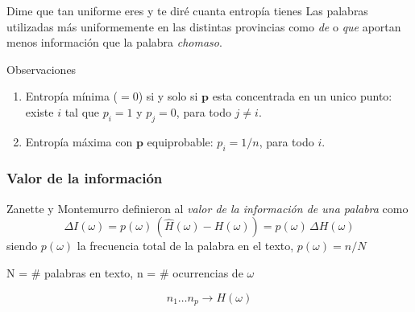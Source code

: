 \begin{frame}[t]
{\begin{columns}
    \end{columns}

}

{
    \begin{exampleblock}{Dime que tan uniforme eres y te diré cuanta entropía tienes} Las palabras utilizadas más uniformemente en las distintas provincias como \textit{de} o \textit{que} aportan menos información que la palabra \textit{chomaso}. 
\end{exampleblock}
}

{
    \begin{block}{Observaciones}
        \begin{enumerate}
            \item Entropía mínima ($=0$)  si y solo si $\mathbf{p}$ esta concentrada en un unico punto: existe $i$ tal que $p_i=1$ y $p_j=0$, para todo $j\not=i$. 
            \item Entropía máxima con $\mathbf{p}$ equiprobable: $p_i=1/n$, para todo $i$. 

        \end{enumerate}

    \end{block}
}
\end{frame}

\begin{frame}[t]\frametitle{Valor de la información}

Zanette y Montemurro definieron al \textit{valor de la información de una palabra} como
 \begin{equation}
  \Delta I(\omega) = p(\omega) \,  (\widehat{H}(\omega) - H(\omega))  =  p(\omega) \, \Delta{H(\omega)}
 \end{equation}
siendo $p(\omega)$ la frecuencia total de la palabra en el texto, $p(\omega) = n/N$ 

N = \# palabras en texto,
n = \# ocurrencias de $\omega$

\begin{equation}
 n_1 \ldots n_p \rightarrow H(\omega)   
\end{equation}



\end{frame}


